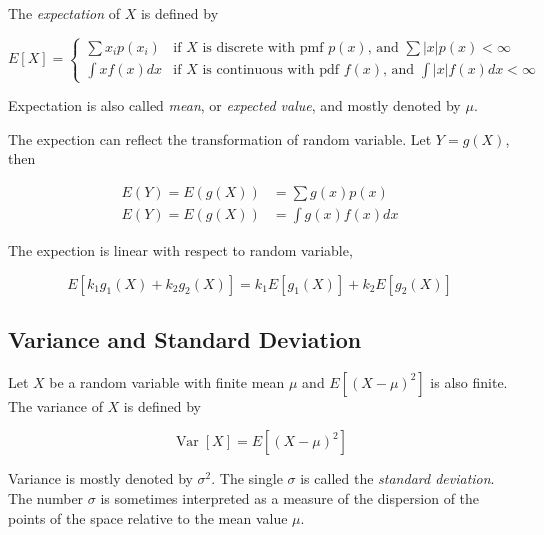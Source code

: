 \documentclass{article}
\begin{document}
            The \textit{expectation} of $ X $ is defined by

            \begin{equation}
                E[X]=\left\{
                    \begin{array}{ll}
                        \sum x_i p(x_{i}) & \text{if } X \text{ is discrete with pmf } p(x) \text{, and }
                            \sum |x| p(x) < \infty \\
                        \int x f(x) dx & \text{if } X \text{ is continuous with pdf } f(x) \text{, and }
                            \int |x| f(x) dx < \infty
                    \end{array}
                \right.
            \end{equation}

            Expectation is also called \textit{mean}, or \textit{expected value},
            and mostly denoted by $ \mu $.

            The expection can reflect the transformation of random variable. Let $ Y = g(X) $, then

            \begin{align*}
                E(Y) = E ( g(X) ) &= \sum g(x) p(x) \\
                E(Y) = E ( g(X) ) &= \int g(x) f(x) dx
            \end{align*}

            The expection is linear with respect to random variable,

            \begin{equation*}
                E [ k_{1} g_{1}(X) + k_{2} g_{2}(X) ] = k_{1} E [ g_{1}(X) ] + k_{2} E [ g_{2}(X) ]
            \end{equation*}

        \subsection{Variance and Standard Deviation}

            Let $ X $ be a random variable with finite mean $ \mu $ and $ E [ (X -
            \mu)^{2} ] $ is also finite. The variance of $ X $ is defined by

            \begin{equation}
                \operatorname{Var}[ X ] = E [ (X - \mu)^{2} ]
            \end{equation}

            Variance is mostly denoted by $ \sigma^{2} $. The single $ \sigma $ is
            called the \textit{standard deviation}. The number $ \sigma $ is sometimes
            interpreted as a measure of the dispersion of the points of the space
            relative to the mean value $ \mu $.
\end{document}

